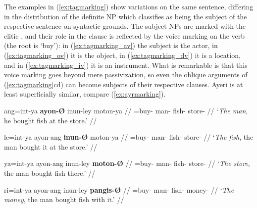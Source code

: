 
\xe

The examples in (\ref{ex:tagmarking}) show variations on the same sentence,
differing in the distribution of the definite NP which \citet{kroeger1991}
classifies as being the subject of the respective sentence on syntactic
grounds. The subject NPs are marked with the clitic , and their role in
the clause is reflected by the voice marking on the verb (the root is 
`buy'): in (\ref{ex:tagmarking_av}) the subject is the actor, in
(\ref{ex:tagmarking_ov}) it is the object, in (\ref{ex:tagmarking_dv}) it is a
location, and in (\ref{ex:tagmarking_iv}) it is an instrument. What is
remarkable is that this voice marking goes beyond mere passivization, so even
the oblique arguments of (\ref{ex:tagmarking}cd) can become subjects of their
respective clauses. Ayeri is at least superficially similar, compare
(\ref{ex:ayrmarking}).

\pex\label{ex:ayrmarking}
\a\label{ex:ayrmarking_at}\begingl
	\gla ang=int-ya \textbf{ayon-Ø} inun-ley moton-ya //
	\glb \AgtT{}=buy-\TsgM{} man-\Top{} fish-\PargI{} store-\Loc{} //
	\glft `\emph{The man}, he bought fish at the store.' //
\endgl

\a\label{ex:ayrmarking_pt}\begingl
	\gla le=int-ya ayon-ang \textbf{inun-Ø} moton-ya //
	\glb \PatTI{}=buy-\TsgM{} man-\Aarg{} fish-\Top{} store-\Loc{} //
	\glft `\emph{The fish}, the man bought it at the store.' //
\endgl

\a\label{ex:ayrmarking_loct}\begingl
	\gla ya=int-ya ayon-ang inun-ley \textbf{moton-Ø} //
	\glb \LocT{}=buy-\TsgM{} man-\Aarg{} fish-\PargI{} store-\Top{} //
	\glft `\emph{The store}, the man bought fish there.' //
\endgl

\a\label{ex:ayrmarking_inst}\begingl
	\gla ri=int-ya ayon-ang inun-ley \textbf{pangis-Ø} //
	\glb \InsT{}=buy-\TsgM{} man-\Aarg{} fish-\PargI{} money-\Top{} //
	\glft `\emph{The money}, the man bought fish with it.' //
\endgl


